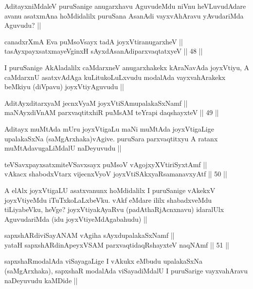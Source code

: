 \begin{artha}
AditayxniMdaleV puruSanige anugarxhavu AguvudeMdu niVnu heVLuvudAdare avanu asatxmAna hoMdidalilx puruSana AsanAdi vayxvAhAravu yAvudariMda Aguvudu? ||
\end{artha}

\begin{shl}
canadxrXmA Eva puMsoV\s sayx tadA joyxVtiranugarxheV || \\
tasAyxpayxsatxmayeV\s ginxH sAyxdAsanAdiparxvaqtatxyeV ||  48 ||  
\end{shl}

\begin{artha}
I puruSanige AkAladalilx caMdarxneV anugarxhakekx kAraNavAda joyxVtiyu, A caMdarxnU asatxvAdAga kuLitukoLuLxvudu modalAda vayxvahArakekx beMkiyu (diVpavu) joyxVtiyAguvudu ||
\end{artha}

\begin{shl}
AditAyxditarxyaM jecnxVyaM joyxVtiSAmupalakaSxNamf || \\
maNAyxdiVnAM parxvaqtitxhiR puMsAM teYrapi daqshayxteV ||  49 ||  
\end{shl}

\begin{artha}
Aditayx muMtAda mUru joyxVtigaLu maNi muMtAda joyxVtigaLige upalakaSxNa (saMgArxhaka)vAgive. puruSara parxvaqtitxyu A ratanx muMtAdavugaLiMdalU naDeyuvudu ||
\end{artha}

\begin{shl}
teVSavxpayxsatxmiteVSavxsayx puMsoV vAgojxyXVtiriSyxtAmf || \\
vAkacx shabodxV\s tarx vijecnxVyoV joyxVtiSAkxyaRsamanavxyAtf ||  50 ||  
\end{shl}

\begin{artha}
A elAlx joyxVtigaLU asatxvanunx hoMdidalilx I puruSanige vAkekxV joyxVtiyeMdu iTuTxkoLaLxbeVku. vAkf eMdare ililx shabadxveMdu tiLiyabeVku, heVge? joyxVtiyakAyaRvu (padAthaRjAcnxnavu) idaralUlx AguvudariMda (idu joyxVtiyeMdAgabahudu) ||
\end{artha}

\begin{shl}
sapxshARdiviSayANAM vAgiha sAyxdupalakaSxNamf || \\
yataH sapxshARdinA\s peyxVSAM parxvaqtidaqRshayxteV naqNAmf ||  51 ||  
\end{shl}

\begin{artha}
sapxshaRmodalAda viSayagaLige I vAkukx eMbudu upalakaSxNa (saMgArxhaka), sapxshaR modalAda viSayadiMdalU I puruSarige vayxvahAravu naDeyuvudu kaMDide ||
\end{artha}

